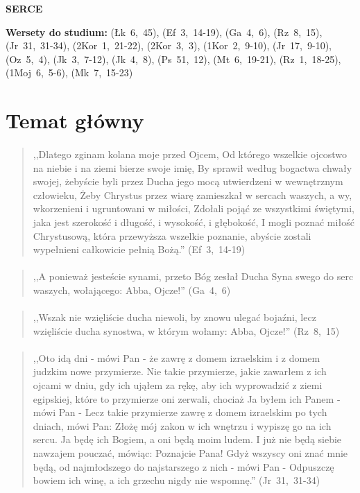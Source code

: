 \documentclass[10pt,a4paper,oneside]{article}
\begin{document}
\centerline{\textbf{\MakeUppercase{Serce}}}
\begin{center}
\textbf{Wersety do studium:} \mbox{(Łk 6, 45)}, \mbox{(Ef 3, 14-19)}, \mbox{(Ga 4, 6)}, \mbox{(Rz 8, 15)}, \mbox{(Jr 31, 31-34)}, \mbox{(2Kor 1, 21-22)}, \mbox{(2Kor 3, 3)}, \mbox{(1Kor 2, 9-10)}, \mbox{(Jr 17, 9-10)}, \mbox{(Oz 5, 4)}, \mbox{(Jk 3, 7-12)}, \mbox{(Jk 4, 8)}, \mbox{(Ps 51, 12)}, \mbox{(Mt 6, 19-21)}, \mbox{(Rz 1, 18-25)}, \mbox{(1Moj 6, 5-6)}, \mbox{(Mk 7, 15-23)}
\end{center}
\section{Temat główny}
\paragraph{}
\begin{quote}
,,Dlatego zginam kolana moje przed Ojcem, Od którego wszelkie ojcostwo na niebie i na ziemi bierze swoje imię, By sprawił według bogactwa chwały swojej, żebyście byli przez Ducha jego mocą utwierdzeni w wewnętrznym człowieku, Żeby Chrystus przez wiarę zamieszkał w sercach waszych, a wy, wkorzenieni i ugruntowani w miłości, Zdołali pojąć ze wszystkimi świętymi, jaka jest szerokość i długość, i wysokość, i głębokość, I mogli poznać miłość Chrystusową, która przewyższa wszelkie poznanie, abyście zostali wypełnieni całkowicie pełnią Bożą.'' \mbox{(Ef 3, 14-19)}
\end{quote}
\paragraph{}
\begin{quote}
,,A ponieważ jesteście synami, przeto Bóg zesłał Ducha Syna swego do serc waszych, wołającego: Abba, Ojcze!'' \mbox{(Ga 4, 6)}
\end{quote}
\paragraph{}
\begin{quote}
,,Wszak nie wzięliście ducha niewoli, by znowu ulegać bojaźni, lecz wzięliście ducha synostwa, w którym wołamy: Abba, Ojcze!'' \mbox{(Rz 8, 15)}
\end{quote}
\paragraph{}
\begin{quote}
,,Oto idą dni - mówi Pan - że zawrę z domem izraelskim i z domem judzkim nowe przymierze. Nie takie przymierze, jakie zawarłem z ich ojcami w dniu, gdy ich ująłem za rękę, aby ich wyprowadzić z ziemi egipskiej, które to przymierze oni zerwali, chociaż Ja byłem ich Panem - mówi Pan - Lecz takie przymierze zawrę z domem izraelskim po tych dniach, mówi Pan: Złożę mój zakon w ich wnętrzu i wypiszę go na ich sercu. Ja będę ich Bogiem, a oni będą moim ludem. I już nie będą siebie nawzajem pouczać, mówiąc: Poznajcie Pana! Gdyż wszyscy oni znać mnie będą, od najmłodszego do najstarszego z nich - mówi Pan - Odpuszczę bowiem ich winę, a ich grzechu nigdy nie wspomnę.'' \mbox{(Jr 31, 31-34)}
\end{quote}
\end{document}
